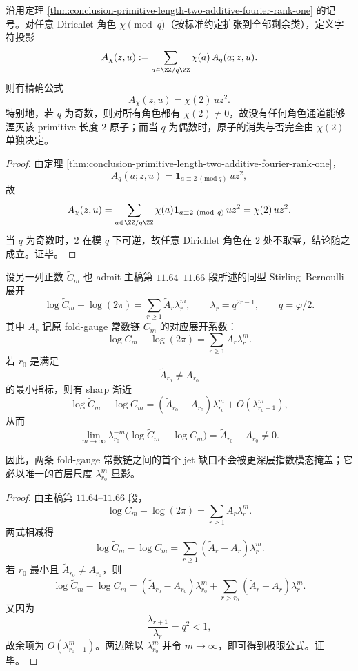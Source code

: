 \begin{corollary}\label{cor:conclusion-primitive-atom-character-rigidity}
沿用定理 \ref{thm:conclusion-primitive-length-two-additive-fourier-rank-one} 的记号。对任意 Dirichlet 角色 \(\chi\pmod q\)（按标准约定扩张到全部剩余类），定义字符投影
\[
A_\chi(z,u):=\sum_{a\in\ZZ/q\ZZ}\chi(a)\,A_q(a;z,u).
\]
则有精确公式
\[
A_\chi(z,u)=\chi(2)\,u z^2.
\]
特别地，若 \(q\) 为奇数，则对所有角色都有 \(\chi(2)\neq0\)，故没有任何角色通道能够湮灭该 primitive 长度 \(2\) 原子；而当 \(q\) 为偶数时，原子的消失与否完全由 \(\chi(2)\) 单独决定。
\end{corollary}
\begin{proof}
由定理 \ref{thm:conclusion-primitive-length-two-additive-fourier-rank-one}，
\[
A_q(a;z,u)=\mathbf 1_{a\equiv 2\ (\mathrm{mod}\ q)}\,u z^2,
\]
故
\[
A_\chi(z,u)
=
\sum_{a\in\ZZ/q\ZZ}\chi(a)\mathbf 1_{a\equiv 2\ (\mathrm{mod}\ q)}\,u z^2
=
\chi(2)\,u z^2.
\]
当 \(q\) 为奇数时，\(2\) 在模 \(q\) 下可逆，故任意 Dirichlet 角色在 \(2\) 处不取零，结论随之成立。证毕。
\end{proof}

\begin{theorem}\label{thm:conclusion-fold-gauge-first-defect-exponential-law}
设另一列正数 \(\widetilde C_m\) 也 admit 主稿第 \(11.64\)–\(11.66\) 段所述的同型 Stirling--Bernoulli 展开
\[
\log \widetilde C_m-\log(2\pi)
=
\sum_{r\ge1}\widetilde A_r \lambda_r^m,
\qquad
\lambda_r=q^{2r-1},
\qquad
q=\varphi/2.
\]
其中 \(A_r\) 记原 fold-gauge 常数链 \(C_m\) 的对应展开系数：
\[
\log C_m-\log(2\pi)=\sum_{r\ge1}A_r\lambda_r^m.
\]
若 \(r_0\) 是满足
\[
\widetilde A_{r_0}\neq A_{r_0}
\]
的最小指标，则有 sharp 渐近
\[
\log \widetilde C_m-\log C_m
=
(\widetilde A_{r_0}-A_{r_0})\lambda_{r_0}^m
+ O(\lambda_{r_0+1}^m),
\]
从而
\[
\lim_{m\to\infty}\lambda_{r_0}^{-m}
\bigl(\log \widetilde C_m-\log C_m\bigr)
=
\widetilde A_{r_0}-A_{r_0}\neq0.
\]

因此，两条 fold-gauge 常数链之间的首个 jet 缺口不会被更深层指数模态掩盖；它必以唯一的首层尺度 \(\lambda_{r_0}^m\) 显影。
\end{theorem}
\begin{proof}
由主稿第 \(11.64\)–\(11.66\) 段，
\[
\log C_m-\log(2\pi)=\sum_{r\ge1}A_r\lambda_r^m.
\]
两式相减得
\[
\log \widetilde C_m-\log C_m
=
\sum_{r\ge1}(\widetilde A_r-A_r)\lambda_r^m.
\]
若 \(r_0\) 最小且 \(\widetilde A_{r_0}\neq A_{r_0}\)，则
\[
\log \widetilde C_m-\log C_m
=
(\widetilde A_{r_0}-A_{r_0})\lambda_{r_0}^m
+ \sum_{r>r_0}(\widetilde A_r-A_r)\lambda_r^m.
\]
又因为
\[
\frac{\lambda_{r+1}}{\lambda_r}=q^2<1,
\]
故余项为 \(O(\lambda_{r_0+1}^m)\)。两边除以 \(\lambda_{r_0}^m\) 并令 \(m\to\infty\)，即可得到极限公式。证毕。
\end{proof}

